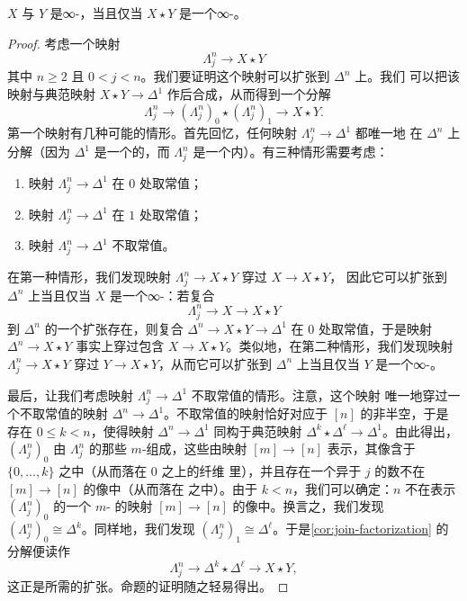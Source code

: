 \begin{proposition}\label{prop:join-infinity-categories}
$X$ 与 $Y$ 是∞-\trCategories{}，当且仅当 $X \star Y$ 是一个∞-\trCategory{}。
\end{proposition}

\begin{proof}
考虑一个映射
\[
\Lambda^n_j \to X \star Y
\]
其中 $n \ge 2$ 且 $0 < j < n$。我们要证明这个映射可以扩张到 $\Delta^n$ 上。我们
可以把该映射与典范映射 $X \star Y \to \Delta^1$ 作后合成，从而得到一个分解
\[
\Lambda^n_j \to (\Lambda^n_j)_0 \star (\Lambda^n_j)_1 \to X \star Y.
\]
第一个映射有几种可能的情形。首先回忆，任何映射 $\Lambda^n_j \to \Delta^1$ 都唯一地
在 $\Delta^n$ 上分解（因为 $\Delta^1$ 是一个\trCategory{}的\trNerve{}，而
$\Lambda^n_j$ 是一个内\trHorn{}）。有三种情形需要考虑：
\begin{enumerate}[label=(\arabic*)]
  \item 映射 $\Lambda^n_j \to \Delta^1$ 在 $0$ 处取常值；
  \item 映射 $\Lambda^n_j \to \Delta^1$ 在 $1$ 处取常值；
  \item 映射 $\Lambda^n_j \to \Delta^1$ 不取常值。
\end{enumerate}
在第一种情形，我们发现映射 $\Lambda^n_j \to X \star Y$ 穿过 $X \to X \star Y$，
因此它可以扩张到 $\Delta^n$ 上当且仅当 $X$ 是一个∞-\trCategory{}：若复合
\[
\Lambda^n_j \to X \to X \star Y
\]
到 $\Delta^n$ 的一个扩张存在，则复合 $\Delta^n \to X \star Y \to \Delta^1$ 在
$0$ 处取常值，于是映射 $\Delta^n \to X \star Y$ 事实上穿过包含
$X \to X \star Y$。类似地，在第二种情形，我们发现映射
$\Lambda^n_j \to X \star Y$ 穿过 $Y \to X \star Y$，从而它可以扩张到
$\Delta^n$ 上当且仅当 $Y$ 是一个∞-\trCategory{}。

最后，让我们考虑映射 $\Lambda^n_j \to \Delta^1$ 不取常值的情形。注意，这个映射
唯一地穿过一个不取常值的映射 $\Delta^n \to \Delta^1$。不取常值的映射恰好对应于
$[n]$ 的非半空\trCut{}，于是存在 $0 \le k < n$，使得映射 $\Delta^n \to \Delta^1$
同构于典范映射 $\Delta^k \star \Delta^\ell \to \Delta^1$。由此得出，
$(\Lambda^n_j)_0$ 由 $\Lambda^n_j$ 的那些 $m$-\trSimplex{}组成，这些\trSimplex{}由映射
$[m] \to [n]$ 表示，其像含于 $\{0, \dotsc, k\}$ 之中（从而落在 $0$ 之上的纤维
里），并且存在一个异于 $j$ 的数不在 $[m] \to [n]$ 的像中（从而落在\trHorn{}%
之中）。由于 $k < n$，我们可以确定：$n$ 不在表示 $(\Lambda^n_j)_0$ 的一个
$m$-\trSimplex{} 的映射 $[m] \to [n]$ 的像中。换言之，我们发现
$(\Lambda^n_j)_0 \cong \Delta^k$。同样地，我们发现
$(\Lambda^n_j)_1 \cong \Delta^\ell$。于是\cref{cor:join-factorization} 的分解便读作
\[
\Lambda^n_j \to \Delta^k \star \Delta^\ell \to X \star Y,
\]
这正是所需的扩张。命题的证明随之轻易得出。
\end{proof}


